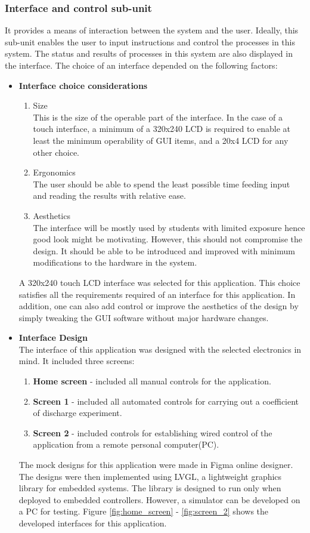 \subsubsection{Interface and control sub-unit}
It provides a means of interaction between the system and the user. Ideally, this sub-unit enables the user to input instructions and control the processes in this system. The status and results of processes in this system are also displayed in the interface. The choice of an interface depended on the following factors:
\begin{itemize}
    \item \textbf{Interface choice considerations}
    \begin{enumerate}
    \item Size \\
    This is the size of the operable part of the interface. In the case of a touch interface, a minimum of a 320x240 LCD is required to enable at least the minimum operability of GUI items, and a 20x4 LCD for any other choice.
    \item Ergonomics \\
    The user should be able to spend the least possible time feeding input and reading the results with relative ease. 
    \item Aesthetics \\
      The interface will be mostly used by students with limited exposure hence good look might be motivating. However, this should not compromise the design. It should be able to be introduced and improved with minimum modifications to the hardware in the system. 
    \end{enumerate}
     A 320x240 touch LCD interface was selected for this application. This choice satisfies all the requirements required of an interface for this application. In addition, one can also add control or  improve the aesthetics of the design by simply tweaking the GUI software without major hardware changes.

     \item \textbf{Interface Design}\\
     The interface of this application was designed with the selected electronics in mind. It included three screens:
     \begin{enumerate}
         \item \textbf{Home screen} - included all manual controls for the application.
         \item \textbf{Screen 1} - included all automated controls for carrying out a coefficient of discharge experiment.
         \item \textbf{Screen 2} - included controls for establishing wired control of the application from a remote personal computer(PC).
     \end{enumerate}
     The mock designs for this application were made in Figma online designer. The designs were then implemented using LVGL, a lightweight graphics library for embedded systems. The library is designed to run only when deployed to embedded controllers. However, a simulator can be developed on a PC for testing.
     Figure \ref{fig:home_screen} - \ref{fig:screen_2} shows the developed interfaces for this application.


\end{itemize}
